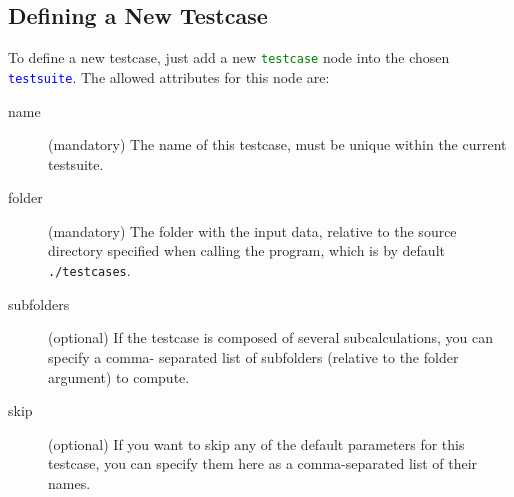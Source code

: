 \documentclass[a4paper,12pt]{scrartcl}
\newcommand{\testsuite}{\textcolor{blue}{\texttt{testsuite}}}
\newcommand{\testcase}{\textcolor{green}{\texttt{testcase}}}
\begin{document}
\subsection{Defining a New Testcase}
To define a new testcase, just add a new \testcase{} node into the chosen \testsuite{}.
The allowed attributes for this node are:
\begin{description}
    \item[name] (mandatory) The name of this testcase, must be unique within the current testsuite.
    \item[folder] (mandatory) The folder with the input data, relative to the source directory specified when
        calling the program, which is by default \texttt{./testcases}.
    \item[subfolders] (optional) If the testcase is composed of several subcalculations, you can specify a comma-
        separated list of subfolders (relative to the folder argument) to compute.
    \item[skip] (optional) If you want to skip any of the default parameters for this testcase, you can specify them
        here as a comma-separated list of their names.
\end{description}
\end{document}
